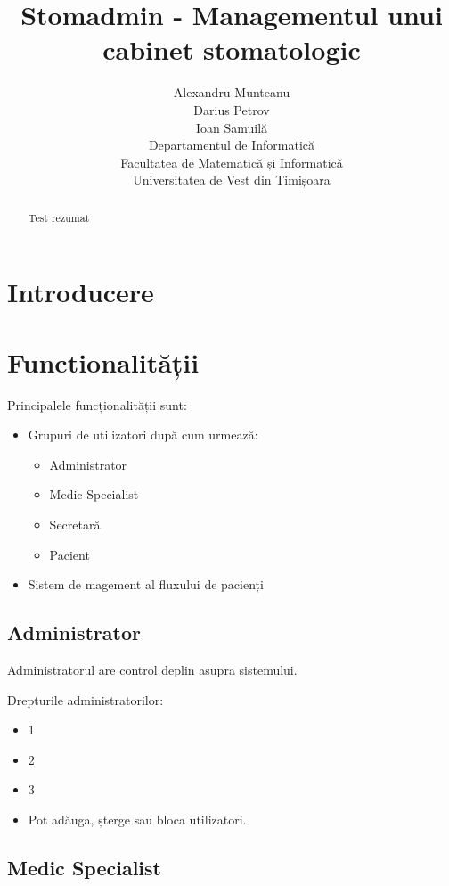 \documentclass[a4paper,12pt]{article}
\title{Stomadmin - Managementul unui cabinet stomatologic}
\author{Alexandru Munteanu\\
Darius Petrov\\
Ioan Samuilă\\
Departamentul de Informatică\\
Facultatea de Matematică și Informatică\\
Universitatea de Vest din Timișoara}
\begin{document}
\maketitle
\begin{abstract}
Test rezumat
\end{abstract}

\pagebreak

\tableofcontents

\pagebreak

\section{Introducere}



\section{Functionalității}

Principalele funcționalității sunt:
\begin{itemize}
\item Grupuri de utilizatori după cum urmează:
\begin{itemize}
\item Administrator
\item Medic Specialist
\item Secretară
\item Pacient
\end{itemize}
\item Sistem de magement al fluxului de pacienți
\end{itemize}

\subsection{Administrator}

Administratorul are control deplin asupra sistemului.

Drepturile administratorilor:

\begin{itemize}
\item 1
\item 2
\item 3
\item Pot adăuga, șterge sau bloca utilizatori.
\end{itemize}

\subsection{Medic Specialist}
\end{document}
